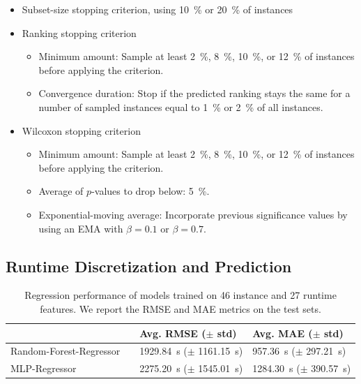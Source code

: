 \documentclass[sn-basic, Numbered]{sn-jnl} %
\begin{document}
\begin{itemize}
  \item Subset-size stopping criterion, using \SI{10}{\%} or \SI{20}{\%} of instances
  \item Ranking stopping criterion
  \begin{itemize}
    \item Minimum amount: Sample at least \SI{2}{\%}, \SI{8}{\%}, \SI{10}{\%}, or \SI{12}{\%} of instances before applying the criterion.
    \item Convergence duration: Stop if the predicted ranking stays the same for a number of sampled instances equal to \SI{1}{\%} or \SI{2}{\%} of all instances.
  \end{itemize}

  \item Wilcoxon stopping criterion
  \begin{itemize}
    \item Minimum amount: Sample at least \SI{2}{\%}, \SI{8}{\%}, \SI{10}{\%}, or \SI{12}{\%} of instances before applying the criterion.
    \item Average of $p$-values to drop below: \SI{5}{\%}.
    \item Exponential-moving average: Incorporate previous significance values by using an EMA with $\beta = 0.1$ or $\beta = 0.7$.
  \end{itemize}
\end{itemize}

\subsection{Runtime Discretization and Prediction}
\label{sec:exdesign:disc-pred}

\begin{table}[htbp]
  \centering
  \caption{Regression performance of models trained on 46 instance and 27 runtime features. We report the RMSE and MAE metrics on the test sets.}
  \begin{tabular}{
    >{\raggedleft\arraybackslash}m{}
    >{\centering\arraybackslash}m{}
    >{\centering\arraybackslash}m{}
    >{\centering\arraybackslash}m{}
  }
    \toprule
    {Regression Models} & & {Avg. RMSE ($\pm$ std)} & {Avg. MAE ($\pm$ std)} \\
    \midrule
    Random-Forest-Regressor & & \SI{1929.84}{s} ($\pm$ \SI{1161.15}{s}) & \phantom{0}\SI{957.36}{s} ($\pm$ \SI{297.21}{s}) \\[0.4ex]
    MLP-Regressor           & & \SI{2275.20}{s} ($\pm$ \SI{1545.01}{s}) & \SI{1284.30}{s} ($\pm$ \SI{390.57}{s}) \\
    \bottomrule
  \end{tabular}
\end{table}
\end{document}
